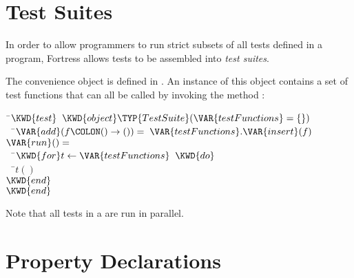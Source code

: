 \section{Test Suites}

In order to allow programmers to run strict subsets of all tests
defined in a program, Fortress allows tests to be
assembled into \emph{test suites}.

The convenience object  is defined in \library.
An instance of this object contains a set of test functions that can all
be called by invoking the method :

%
%
\begin{Fortress}
{\tt~}\pushtabs\=\+\( \KWD{test}\;\;\KWD{object} \TYP{TestSuite}(\VAR{testFunctions} = \{\})\)\\[4pt]
{\tt~~}\pushtabs\=\+\(   \VAR{add}(f\COLON () \rightarrow ()) = \;\VAR{testFunctions}.\VAR{insert}(f)\)\\[4pt]
\(   \VAR{run}() =\)\\
{\tt~~}\pushtabs\=\+\(     \KWD{for} t \leftarrow \VAR{testFunctions}\;\;\KWD{do}\)\\
{\tt~~}\pushtabs\=\+\(       t()\)\-\\\poptabs
\(     \KWD{end}\)\-\-\\\poptabs\poptabs
\( \KWD{end}\)\-\\\poptabs
\end{Fortress}

Note that all tests in a  are run in parallel.

\section{Property Declarations}

